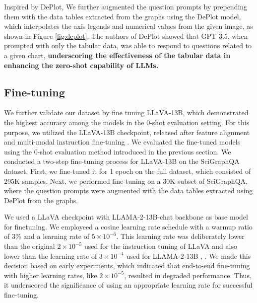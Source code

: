 \documentclass{article}
\begin{document}
Inspired by DePlot\cite{liu2022deplot}, We further augmented the question prompts by prepending them with the data tables extracted from the graphs using the DePlot model, which interpolates the axis legends and numerical values from the given image, as shown in Figure \ref{fig:deplot}. The authors of DePlot showed that GPT 3.5, when prompted with only the tabular data, was able to respond to questions related to a given chart, {\bf underscoring the effectiveness of the tabular data in enhancing the zero-shot capability of LLMs.}
\subsection{Fine-tuning}\label{finetuningmethod}
We further validate our dataset by fine tuning LLaVA-13B, which demonstrated the highest accuracy among the models in the 0-shot evaluation setting. For this purpose, we utilized the LLaVA-13B checkpoint, released after feature alignment and multi-modal instruction fine-tuning \cite{liu2023}. We evaluated the fine-tuned models using the 0-shot evaluation method introduced in the previous section.
We conducted a two-step fine-tuning process for LLaVA-13B on the SciGraphQA dataset. First, we fine-tuned it for 1 epoch on the full dataset, which consisted of 295K samples. Next, we performed fine-tuning on a 30K subset of SciGraphQA, where the question prompts were augmented with the data tables extracted using DePlot from the graphs.

We used a LLaVA checkpoint with LLAMA-2-13B-chat backbone as base model for finetuning. We employeed a cosine learning rate schedule with a warmup ratio of 3\% and a learning rate of \(5 \times 10^{-6}\). This learning rate was deliberately lower than the original \(2 \times 10^{-5}\) used for the instruction tuning of LLaVA and also lower than the learning rate of \(3 \times 10^{-4}\) used for LLAMA-2-13B \cite{liu2023}, \cite{touvron2023}. We made this decision based on early experiments, which indicated that end-to-end fine-tuning with higher learning rates, like \(2 \times 10^{-5}\), resulted in degraded performance. Thus, it underscored the significance of using an appropriate learning rate for successful fine-tuning.
\end{document}

